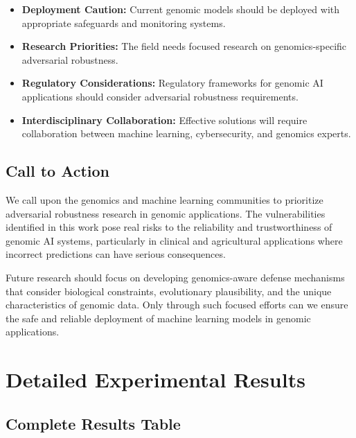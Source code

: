 \documentclass{article} %
\begin{document}
\begin{itemize}
    \item \textbf{Deployment Caution:} Current genomic models should be deployed with appropriate safeguards and monitoring systems.
    
    \item \textbf{Research Priorities:} The field needs focused research on genomics-specific adversarial robustness.
    
    \item \textbf{Regulatory Considerations:} Regulatory frameworks for genomic AI applications should consider adversarial robustness requirements.
    
    \item \textbf{Interdisciplinary Collaboration:} Effective solutions will require collaboration between machine learning, cybersecurity, and genomics experts.
\end{itemize}

\subsection{Call to Action}

We call upon the genomics and machine learning communities to prioritize adversarial robustness research in genomic applications. The vulnerabilities identified in this work pose real risks to the reliability and trustworthiness of genomic AI systems, particularly in clinical and agricultural applications where incorrect predictions can have serious consequences.

Future research should focus on developing genomics-aware defense mechanisms that consider biological constraints, evolutionary plausibility, and the unique characteristics of genomic data. Only through such focused efforts can we ensure the safe and reliable deployment of machine learning models in genomic applications.




\appendix

\section{Detailed Experimental Results}

\subsection{Complete Results Table}
\end{document}
